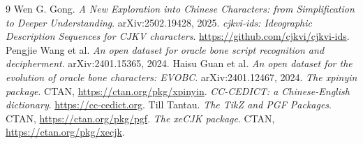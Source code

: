 \documentclass[11pt]{article}
\begin{document}
\begin{thebibliography}{9}
 Wen G. Gong. \emph{A New Exploration into Chinese Characters: from Simplification to Deeper Understanding}. arXiv:2502.19428, 2025.
 \emph{cjkvi-ids: Ideographic Description Sequences for CJKV characters}. \url{https://github.com/cjkvi/cjkvi-ids}.
 Pengjie Wang et al. \emph{An open dataset for oracle bone script recognition and decipherment}. arXiv:2401.15365, 2024.
 Haisu Guan et al. \emph{An open dataset for the evolution of oracle bone characters: EVOBC}. arXiv:2401.12467, 2024.
 \emph{The xpinyin package}. CTAN, \url{https://ctan.org/pkg/xpinyin}.
 \emph{CC-CEDICT: a Chinese-English dictionary}. \url{https://cc-cedict.org}.
 Till Tantau. \emph{The TikZ and PGF Packages}. CTAN, \url{https://ctan.org/pkg/pgf}.
 \emph{The xeCJK package}. CTAN, \url{https://ctan.org/pkg/xecjk}.
\end{thebibliography}
\end{document}
